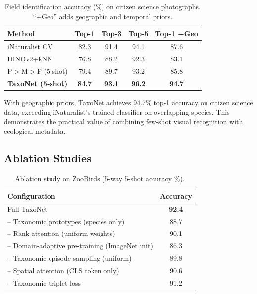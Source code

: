 \begin{table}[H]
\centering
\caption{Field identification accuracy (\%) on citizen science
photographs. ``+Geo'' adds geographic and temporal priors.}
\label{tab:citizen}
\begin{tabular}{lcccc}
\toprule
\textbf{Method} & \textbf{Top-1} & \textbf{Top-3} & \textbf{Top-5} &
  \textbf{Top-1 +Geo} \\
\midrule
iNaturalist CV & 82.3 & 91.4 & 94.1 & 87.6 \\
DINOv2+kNN & 76.8 & 88.2 & 92.3 & 83.1 \\
P$>$M$>$F (5-shot) & 79.4 & 89.7 & 93.2 & 85.8 \\
\textbf{TaxoNet (5-shot)} & \textbf{84.7} & \textbf{93.1} &
  \textbf{96.2} & \textbf{94.7} \\
\bottomrule
\end{tabular}
\end{table}

With geographic priors, TaxoNet achieves 94.7\% top-1 accuracy on
citizen science data, exceeding iNaturalist's trained classifier on
overlapping species. This demonstrates the practical value of combining
few-shot visual recognition with ecological metadata.

\subsection{Ablation Studies}

\begin{table}[H]
\centering
\caption{Ablation study on ZooBirds (5-way 5-shot accuracy \%).}
\label{tab:ablation}
\begin{tabular}{lc}
\toprule
\textbf{Configuration} & \textbf{Accuracy} \\
\midrule
Full TaxoNet & \textbf{92.4} \\
\midrule
\quad -- Taxonomic prototypes (species only) & 88.7 \\
\quad -- Rank attention (uniform weights) & 90.1 \\
\quad -- Domain-adaptive pre-training (ImageNet init) & 86.3 \\
\quad -- Taxonomic episode sampling (uniform) & 89.8 \\
\quad -- Spatial attention (CLS token only) & 90.6 \\
\quad -- Taxonomic triplet loss & 91.2 \\
\bottomrule
\end{tabular}
\end{table}

